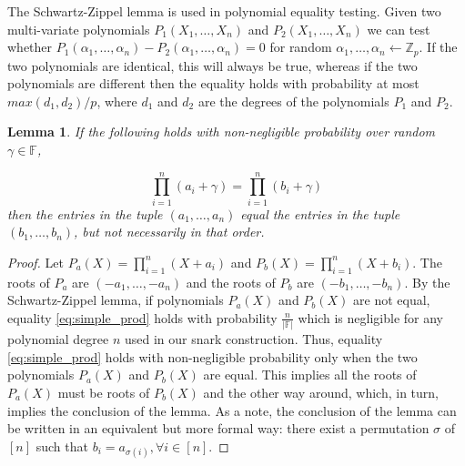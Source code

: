 \documentclass[11pt]{article} %
\newcommand{\F}{\ensuremath{\mathbb F}\xspace}
\newtheorem{lemma}{Lemma}[section]
\begin{document}
The Schwartz-Zippel lemma is used in polynomial equality testing. Given two multi-variate polynomials $P_1(X_1, \ldots, X_n)$
and $P_2(X_1, \ldots, X_n)$ we can test whether $P_1(\alpha_1, \ldots, \alpha_n) -  P_2(\alpha_1, \ldots, \alpha_n)  = 0$ for random $\alpha_1, \ldots, \alpha_n  \leftarrow \mathbb{Z}_p$.
If the two polynomials are identical, this will always be true, whereas if the two polynomials are different then the equality holds with probability at most $max(d_1, d_2)/p$, where $d_1$ and 
$d_2$ are the degrees of the polynomials $P_1$ and $P_2$. 

\begin{lemma}\label{le:simple_prod}
If the following holds with non-negligible probability over random $\gamma \in \F$, 

\begin{equation}
\label{eq:simple_prod}
\prod_{i=1}^{n}(a_i+\gamma) = \prod_{i=1}^{n}(b_i+\gamma) 
\end{equation} 
then the entries in the tuple $(a_1, \ldots, a_n)$ equal the entries in the tuple $(b_1, \ldots, b_n)$, but not necessarily in that order. 
\end{lemma}

\begin{proof}
Let $P_a(X) =  \prod_{i=1}^{n}(X+ a_i)$ and $P_b(X) = \prod_{i=1}^{n}(X+b_i)$. The roots of $P_a$ are $(-a_1, \ldots, -a_n)$ and the roots of $P_b$ are $(-b_1, \ldots, -b_n)$.  
By the Schwartz-Zippel lemma, if polynomials $P_a(X)$ and $P_b(X)$ are not equal, equality \ref{eq:simple_prod} holds with probability $\frac{n}{|\mathbb{F}|}$ which is negligible for any polynomial degree $n$ used in our snark construction. 
Thus, equality \ref{eq:simple_prod} holds with non-negligible probability only when the two polynomials $P_a(X)$ and $P_b(X)$ are equal. This implies all the roots of $P_a(X)$ must be roots of $P_b(X)$ and the other way around, which, in turn, 
implies the conclusion of the lemma. As a note, the conclusion of the lemma can be written in an equivalent but more formal way: there exist a permutation $\sigma$ of $[n]$ such that $b_i = a_{\sigma(i)}, \forall i \in [n]$.
\end{proof}
\end{document}
